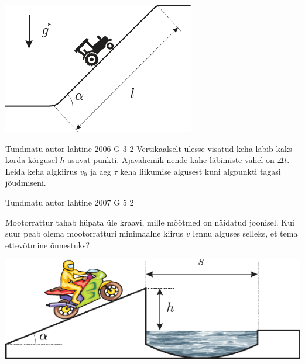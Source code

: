 \documentclass[11pt, twoside]{article}
\begin{document}
{{\begin{center}
	\includegraphics[width=0.5\linewidth]{2005-lahg-02-yl}
\end{center}
\fi
}

{Tundmatu autor} %
{lahtine} %
{2006} %
{G 3} %
{2} %
{
\ifStatement
Vertikaalselt ülesse visatud keha läbib kaks korda kõrgusel $h$ asuvat punkti. Ajavahemik nende kahe läbimiste vahel on $\Delta t$. Leida keha algkiirus $v_0$ ja aeg $\tau$ keha liikumise algusest kuni algpunkti tagasi jõudmiseni.
\fi
}

{Tundmatu autor} %
{lahtine} %
{2007} %
{G 5} %
{2} %
{
\ifStatement
Mootorrattur tahab hüpata üle kraavi, mille mõõtmed on näidatud joonisel. Kui suur peab olema mootorratturi minimaalne kiirus $v$ lennu alguses selleks, et tema ettevõtmine õnnestuks?

\begin{center}
	\includegraphics[width=0.8\linewidth]{2007-lahg-05-yl}
\end{center}
\fi
}
\newpage


}
\end{document}
